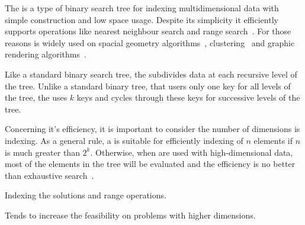 The \kdtree{} is a type of binary search tree for indexing multidimensional
data with simple construction and low space usage.
Despite its simplicity it efficiently supports operations like nearest
neighbour search and range search~\cite{bentley1975}.
For those reasons \kdtree{} is widely used on
spacial geometry algorithms~\cite{preparata2012computational, guttman1984r}, 
clustering~\cite{kanungo2002efficient, indyk1998approximate}
and graphic rendering algorithms~\cite{owens2007survey}.

Like a standard binary search tree, the \kdtree{} subdivides data at each
recursive level of the tree.
Unlike a standard binary tree, that users only one key for all levels of the tree,
the \kdtree{} uses $k$ keys and cycles through these keys for successive levels
of the tree.


Concerning it's efficiency, it is important to consider the number of dimensions
\kdtree{} is indexing.
As a general rule, a \kdtree{} is suitable for efficiently indexing of $n$ elements
if $n$ is much greater than $2^k$.
Otherwise, when \kdtree{} are used with high-dimensional data, most of the elements
in the tree will be evaluated and the efficiency is no better than exhaustive search~\cite{toth2004handbook}.

Indexing the solutions and range operations.

Tends to increase the feasibility on problems with higher dimensions.


